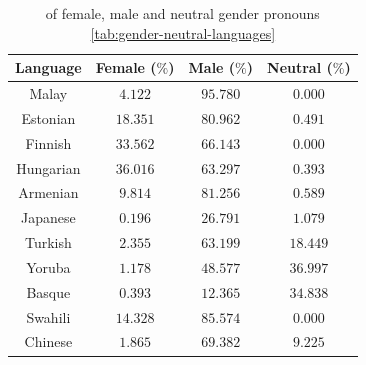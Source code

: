 \documentclass[fleqn,10pt]{article}
\begin{document}
\begin{table}[H]
\small{
	\centering
	\begin{tabular}{|c|c|c|c|}
	\hline
	Language 	& Female ($\%$) 	& Male ($\%$)		& Neutral ($\%$)	\\ \hline
	\hline
	Malay     	& $4.122$ 			& $95.780$  		& $0.000$			\\ \hline
	Estonian  	& $18.351$			& $80.962$  		& $0.491$			\\ \hline
	Finnish   	& $33.562$			& $66.143$  		& $0.000$			\\ \hline
	Hungarian 	& $36.016$			& $63.297$  		& $0.393$			\\ \hline
	Armenian  	& $9.814$			& $81.256$  		& $0.589$			\\ \hline
	Japanese  	& $0.196$			& $26.791$  		& $1.079$			\\ \hline
	Turkish   	& $2.355$			& $63.199$  		& $18.449$			\\ \hline
	Yoruba    	& $1.178$			& $48.577$  		& $36.997$			\\ \hline
	Basque    	& $0.393$			& $12.365$  		& $34.838$			\\ \hline
	Swahili   	& $14.328$ 			& $85.574$  		& $0.000$			\\ \hline
	Chinese   	& $1.865$ 			& $69.382$  		& $9.225$			\\ \hline
	\end{tabular}
	\caption{ of female, male and neutral gender pronouns \ref{tab:gender-neutral-languages}}
	\label{tab:gender-by-language}
	}
\end{table}
\end{document}
